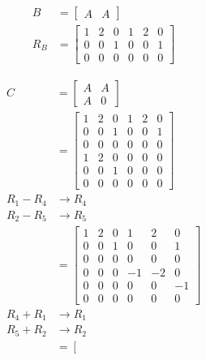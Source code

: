 \documentclass[main.tex]{subfiles}
\begin{document}
\begin{enumerate}
        $$
        \begin{aligned}
        B &=\left[\begin{array}{ll}
        A & A
        \end{array}\right]\\
        R_{B}&=\left[\begin{array}{llllll}
        1 & 2 & 0 & 1 & 2 & 0 \\
        0 & 0 & 1 & 0 & 0 & 1 \\
        0 & 0 & 0 & 0 & 0 & 0
        \end{array}\right]
        \end{aligned}
        $$
        
        $$
        \begin{aligned}
        C &= \left[\begin{array}{ll}
        A & A \\
        A & 0
        \end{array}\right]\\
        &= \left[\begin{array}{llllll}
        1 & 2 & 0 & 1 & 2 & 0 \\
        0 & 0 & 1 & 0 & 0 & 1 \\
        0 & 0 & 0 & 0 & 0 & 0 \\
        1 & 2 & 0 & 0 & 0 & 0 \\
        0 & 0 & 1 & 0 & 0 & 0 \\
        0 & 0 & 0 & 0 & 0 & 0
        \end{array}\right]\\
        R_1 - R_4 & \rightarrow R_4\\
        R_2 - R_5 & \rightarrow R_5\\
        & = \left[\begin{array}{cccccc}
        1 & 2 & 0 & 1 & 2 & 0 \\
        0 & 0 & 1 & 0 & 0 & 1 \\
        0 & 0 & 0 & 0 & 0 & 0 \\
        0 & 0 & 0 & -1 & -2 & 0 \\
        0 & 0 & 0 & 0 & 0 & -1 \\
        0 & 0 & 0 & 0 & 0 & 0
        \end{array}\right]\\
        R_4 + R_1 & \rightarrow R_1\\
        R_5 + R_2 & \rightarrow R_2\\
        & = \left[\begin{array}{cccccc}

\end{array}
\end{aligned}$$
\end{enumerate}
\end{document}
